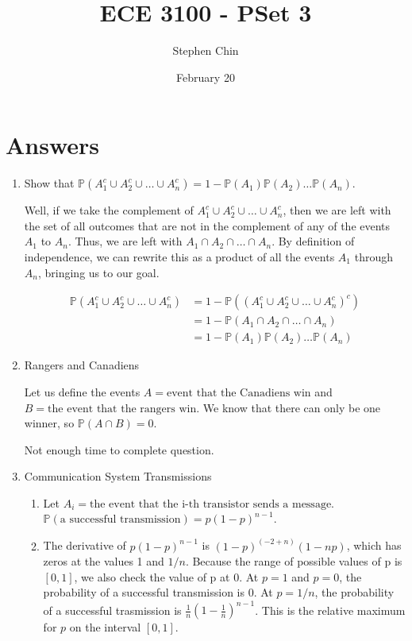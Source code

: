 \documentclass{article}
\title{ECE 3100 - PSet 3}
\author{Stephen Chin}
\date{February 20}
\begin{document}
\maketitle

\section*{Answers}

\begin{enumerate}[itemsep=12pt]
\item
  Show that $\mathbb{P} (A_1^c \cup A_2^c \cup \dots \cup A_n^c) =
  1 - \mathbb{P}(A_1) \mathbb{P}(A_2) \dots \mathbb{P}(A_n)$.

  Well, if we take the complement of $A_1^c \cup A_2^c \cup \dots \cup A_n^c$, then we are left with
  the set of all outcomes that are not in the complement of any of the events $A_1$ to $A_n$. Thus,
  we are left with $A_1 \cap A_2 \cap \dots \cap A_n$. By definition of independence, we can rewrite
  this as a product of all the events $A_1$ through $A_n$, bringing us to our goal.
  
  \[
    \begin{aligned}
      \mathbb{P} (A_1^c \cup A_2^c \cup \dots \cup A_n^c)
      &= 1 - \mathbb{P} ((A_1^c \cup A_2^c \cup \dots \cup A_n^c)^c) \\
      &= 1 - \mathbb{P} (A_1 \cap A_2 \cap \dots \cap A_n) \\
      &= 1 - \mathbb{P} (A_1) \mathbb{P} (A_2) \dots \mathbb{P} (A_n)
    \end{aligned}
  \]
  

\item
  Rangers and Canadiens

  Let us define the events $A = { \text{event that the Canadiens win}}$ and $B = { \text{the event
      that the rangers win}}$. We know that there can only be one winner, so $\mathbb{P} ( A \cap B
  ) = 0$.
  
  Not enough time to complete question.


\item
 Communication System Transmissions

  \begin{enumerate}
  \item
    Let $A_i = { \text{the event that the i-th transistor sends a message}}$.
    $\mathbb{P} (\text{a successful transmission}) = p(1 - p)^{n-1}$.

  \item
    The derivative of $p(1 - p)^{n-1}$ is $(1 - p)^{(-2 + n)} (1 - n p)$, which has zeros at the
    values 1 and $1/n$. Because the range of possible values of p is $[0, 1]$, we also check the
    value of p at 0. At $p = 1$ and $p = 0$, the probability of a successful transmission is $0$. At
    $p = 1/n$, the probability of a successful trasmission is
    $\frac{1}{n} (1 - \frac{1}{n})^{n - 1}$. This is the relative maximum for $p$ on the interval
    $[0, 1]$.


\end{enumerate}
\end{enumerate}
\end{document}
